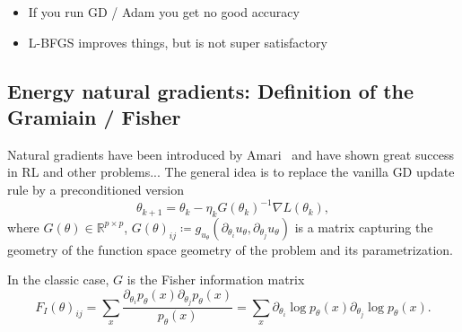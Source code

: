 \documentclass[11pt]{article}
\theoremstyle{definition}
\theoremstyle{plain}
\begin{document}
\begin{itemize}
    \item If you run GD / Adam you get no good accuracy~\cite{?}
    \item L-BFGS improves things, but is not super satisfactory 
\end{itemize}

\subsection{Energy natural gradients: Definition of the Gramiain / Fisher}


Natural gradients have been introduced by Amari~\cite{?} and have shown great success in RL and other problems... 
The general idea is to replace the vanilla GD update rule by a preconditioned version 
    \[ \theta_{k+1} = \theta_k - \eta_k G(\theta_k)^{-1} \nabla L(\theta_k), \]
where $G(\theta)\in\mathbb R^{p\times p}$, $G(\theta)_{ij} \coloneqq g_{u_\theta}(\partial_{\theta_i} u_\theta, \partial_{\theta_j} u_\theta)$ is a matrix capturing the geometry of the function space geometry of the problem and its parametrization. 

In the classic case, $G$ is the Fisher information matrix 
\begin{equation}
    F_I(\theta)_{ij} = \sum_{x} \frac{\partial_{\theta_i}p_\theta(x)\partial_{\theta_j}p_\theta(x)}{p_\theta(x)} = \sum_{x} \partial_{\theta_i} \log p_\theta(x) \partial_{\theta_j} \log p_\theta(x). 
\end{equation}
\end{document}
